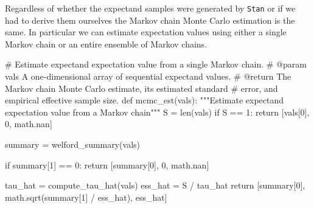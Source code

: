 \documentclass[
  letterpaper,
  DIV=11,
  numbers=noendperiod]{scrartcl}
\newenvironment{Shaded}{\begin{snugshade}}{\end{snugshade}}
\newcommand{\BuiltInTok}[1]{\textcolor[rgb]{0.00,0.23,0.31}{#1}}
\newcommand{\CommentTok}[1]{\textcolor[rgb]{0.37,0.37,0.37}{#1}}
\newcommand{\ControlFlowTok}[1]{\textcolor[rgb]{0.00,0.23,0.31}{#1}}
\newcommand{\DecValTok}[1]{\textcolor[rgb]{0.68,0.00,0.00}{#1}}
\newcommand{\KeywordTok}[1]{\textcolor[rgb]{0.00,0.23,0.31}{#1}}
\newcommand{\NormalTok}[1]{\textcolor[rgb]{0.00,0.23,0.31}{#1}}
\newcommand{\OperatorTok}[1]{\textcolor[rgb]{0.37,0.37,0.37}{#1}}
\begin{document}
Regardless of whether the expectand samples were generated by
\texttt{Stan} or if we had to derive them ourselves the Markov chain
Monte Carlo estimation is the same. In particular we can estimate
expectation values using either a single Markov chain or an entire
ensemble of Markov chains.

\begin{Shaded}
\begin{Highlighting}[]
\CommentTok{\# Estimate expectand expectation value from a single Markov chain.}
\CommentTok{\# @param vals A one{-}dimensional array of sequential expectand values.}
\CommentTok{\# @return The Markov chain Monte Carlo estimate, its estimated standard}
\CommentTok{\#         error, and empirical effective sample size.}
\KeywordTok{def}\NormalTok{ mcmc\_est(vals):}
  \CommentTok{"""Estimate expectand expectation value from a Markov chain"""}
\NormalTok{  S }\OperatorTok{=} \BuiltInTok{len}\NormalTok{(vals)}
  \ControlFlowTok{if}\NormalTok{ S }\OperatorTok{==} \DecValTok{1}\NormalTok{:}
    \ControlFlowTok{return}\NormalTok{ [vals[}\DecValTok{0}\NormalTok{], }\DecValTok{0}\NormalTok{, math.nan]}
  
\NormalTok{  summary }\OperatorTok{=}\NormalTok{ welford\_summary(vals)}
  
  \ControlFlowTok{if}\NormalTok{ summary[}\DecValTok{1}\NormalTok{] }\OperatorTok{==} \DecValTok{0}\NormalTok{:}
    \ControlFlowTok{return}\NormalTok{ [summary[}\DecValTok{0}\NormalTok{], }\DecValTok{0}\NormalTok{, math.nan]}
  
\NormalTok{  tau\_hat }\OperatorTok{=}\NormalTok{ compute\_tau\_hat(vals)}
\NormalTok{  ess\_hat }\OperatorTok{=}\NormalTok{ S }\OperatorTok{/}\NormalTok{ tau\_hat}
  \ControlFlowTok{return}\NormalTok{ [summary[}\DecValTok{0}\NormalTok{], math.sqrt(summary[}\DecValTok{1}\NormalTok{] }\OperatorTok{/}\NormalTok{ ess\_hat), ess\_hat]}
\end{Highlighting}
\end{Shaded}
\end{document}
